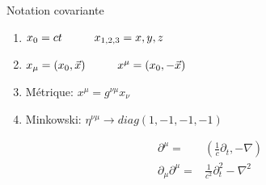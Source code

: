 \documentclass[handout]{beamer}
\begin{document}
\begin{frame}


\begin{block}{Notation covariante}

\begin{enumerate}
\item $x_0 = ct \hspace{1 cm} x_{1,2,3} = x,y,z$
\item $x_\mu = (x_0,\vec{x}) \hspace{1 cm} x^\mu = (x_0,-\vec{x})$
\item Métrique: $x^\mu = g^{\nu\mu} x_\nu$
\item Minkowski: $\eta^{\nu\mu} \rightarrow diag(1,-1,-1,-1)$
\end{enumerate}

\end{block}
\begin{align*}
\partial^\mu =& (\frac{1}{c} \partial_t, -\nabla) \\
\partial_\mu \partial^\mu =& \frac{1}{c^2} \partial_t^2- \nabla^2
\end{align*}
\end{frame}
\end{document}
